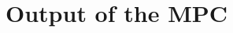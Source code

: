 \documentclass[a4paper,11pt]{article}
\begin{document}
 


%
%
%
%

\section{Output of the MPC}
\end{document}
